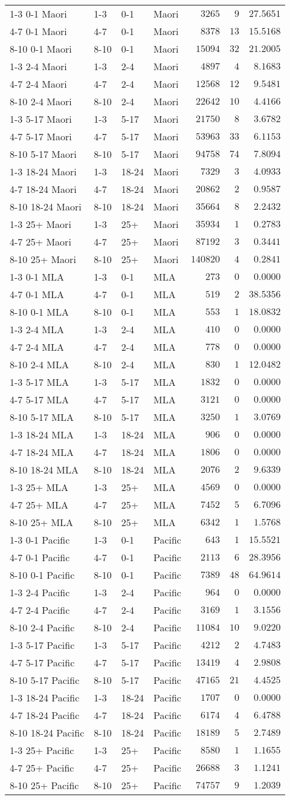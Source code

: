 \begin{table}[!tbp]
\begin{center}
\begin{tabular}{llllrrr}
1-3 0-1 Maori&1-3&0-1&Maori&$  3265$&$  9$&$27.5651$\tabularnewline
4-7 0-1 Maori&4-7&0-1&Maori&$  8378$&$ 13$&$15.5168$\tabularnewline
8-10 0-1 Maori&8-10&0-1&Maori&$ 15094$&$ 32$&$21.2005$\tabularnewline
1-3 2-4 Maori&1-3&2-4&Maori&$  4897$&$  4$&$ 8.1683$\tabularnewline
4-7 2-4 Maori&4-7&2-4&Maori&$ 12568$&$ 12$&$ 9.5481$\tabularnewline
8-10 2-4 Maori&8-10&2-4&Maori&$ 22642$&$ 10$&$ 4.4166$\tabularnewline
1-3 5-17 Maori&1-3&5-17&Maori&$ 21750$&$  8$&$ 3.6782$\tabularnewline
4-7 5-17 Maori&4-7&5-17&Maori&$ 53963$&$ 33$&$ 6.1153$\tabularnewline
8-10 5-17 Maori&8-10&5-17&Maori&$ 94758$&$ 74$&$ 7.8094$\tabularnewline
1-3 18-24 Maori&1-3&18-24&Maori&$  7329$&$  3$&$ 4.0933$\tabularnewline
4-7 18-24 Maori&4-7&18-24&Maori&$ 20862$&$  2$&$ 0.9587$\tabularnewline
8-10 18-24 Maori&8-10&18-24&Maori&$ 35664$&$  8$&$ 2.2432$\tabularnewline
1-3 25+ Maori&1-3&25+&Maori&$ 35934$&$  1$&$ 0.2783$\tabularnewline
4-7 25+ Maori&4-7&25+&Maori&$ 87192$&$  3$&$ 0.3441$\tabularnewline
8-10 25+ Maori&8-10&25+&Maori&$140820$&$  4$&$ 0.2841$\tabularnewline
1-3 0-1 MLA&1-3&0-1&MLA&$   273$&$  0$&$ 0.0000$\tabularnewline
4-7 0-1 MLA&4-7&0-1&MLA&$   519$&$  2$&$38.5356$\tabularnewline
8-10 0-1 MLA&8-10&0-1&MLA&$   553$&$  1$&$18.0832$\tabularnewline
1-3 2-4 MLA&1-3&2-4&MLA&$   410$&$  0$&$ 0.0000$\tabularnewline
4-7 2-4 MLA&4-7&2-4&MLA&$   778$&$  0$&$ 0.0000$\tabularnewline
8-10 2-4 MLA&8-10&2-4&MLA&$   830$&$  1$&$12.0482$\tabularnewline
1-3 5-17 MLA&1-3&5-17&MLA&$  1832$&$  0$&$ 0.0000$\tabularnewline
4-7 5-17 MLA&4-7&5-17&MLA&$  3121$&$  0$&$ 0.0000$\tabularnewline
8-10 5-17 MLA&8-10&5-17&MLA&$  3250$&$  1$&$ 3.0769$\tabularnewline
1-3 18-24 MLA&1-3&18-24&MLA&$   906$&$  0$&$ 0.0000$\tabularnewline
4-7 18-24 MLA&4-7&18-24&MLA&$  1806$&$  0$&$ 0.0000$\tabularnewline
8-10 18-24 MLA&8-10&18-24&MLA&$  2076$&$  2$&$ 9.6339$\tabularnewline
1-3 25+ MLA&1-3&25+&MLA&$  4569$&$  0$&$ 0.0000$\tabularnewline
4-7 25+ MLA&4-7&25+&MLA&$  7452$&$  5$&$ 6.7096$\tabularnewline
8-10 25+ MLA&8-10&25+&MLA&$  6342$&$  1$&$ 1.5768$\tabularnewline
1-3 0-1 Pacific&1-3&0-1&Pacific&$   643$&$  1$&$15.5521$\tabularnewline
4-7 0-1 Pacific&4-7&0-1&Pacific&$  2113$&$  6$&$28.3956$\tabularnewline
8-10 0-1 Pacific&8-10&0-1&Pacific&$  7389$&$ 48$&$64.9614$\tabularnewline
1-3 2-4 Pacific&1-3&2-4&Pacific&$   964$&$  0$&$ 0.0000$\tabularnewline
4-7 2-4 Pacific&4-7&2-4&Pacific&$  3169$&$  1$&$ 3.1556$\tabularnewline
8-10 2-4 Pacific&8-10&2-4&Pacific&$ 11084$&$ 10$&$ 9.0220$\tabularnewline
1-3 5-17 Pacific&1-3&5-17&Pacific&$  4212$&$  2$&$ 4.7483$\tabularnewline
4-7 5-17 Pacific&4-7&5-17&Pacific&$ 13419$&$  4$&$ 2.9808$\tabularnewline
8-10 5-17 Pacific&8-10&5-17&Pacific&$ 47165$&$ 21$&$ 4.4525$\tabularnewline
1-3 18-24 Pacific&1-3&18-24&Pacific&$  1707$&$  0$&$ 0.0000$\tabularnewline
4-7 18-24 Pacific&4-7&18-24&Pacific&$  6174$&$  4$&$ 6.4788$\tabularnewline
8-10 18-24 Pacific&8-10&18-24&Pacific&$ 18189$&$  5$&$ 2.7489$\tabularnewline
1-3 25+ Pacific&1-3&25+&Pacific&$  8580$&$  1$&$ 1.1655$\tabularnewline
4-7 25+ Pacific&4-7&25+&Pacific&$ 26688$&$  3$&$ 1.1241$\tabularnewline
8-10 25+ Pacific&8-10&25+&Pacific&$ 74757$&$  9$&$ 1.2039$\tabularnewline
\hline
\end{tabular}\end{center}

\end{table}
